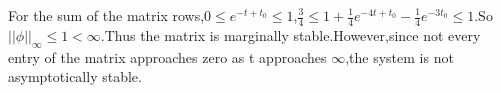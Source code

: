 \documentclass{article}
\begin{document}
For the sum of the matrix rows,$0\leq e^{-t+t_0} \leq 1$,$\frac{3}{4}\leq 1+\frac{1}{4}e^{-4t+t_0}-\frac{1}{4}e^{-3t_0}\leq 1$.So $||\phi||_{\infty} \leq 1<\infty$.Thus the matrix is marginally stable.However,since not every entry of the matrix approaches zero as t approaches $\infty$,the system is not asymptotically stable.
\end{document}
